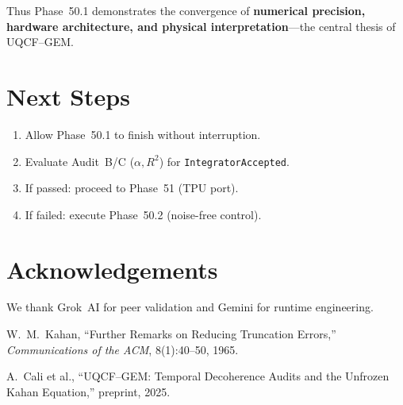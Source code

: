 \documentclass[11pt]{article}
\begin{document}
Thus Phase~50.1 demonstrates the convergence of \textbf{numerical precision, hardware architecture, and physical interpretation}---the central thesis of UQCF--GEM.

\section{Next Steps}
\begin{enumerate}[label=\arabic*.]
  \item Allow Phase~50.1 to finish without interruption.
  \item Evaluate Audit~B/C (\(\alpha, R^2\)) for \texttt{IntegratorAccepted}.
  \item If passed: proceed to Phase~51 (TPU port).
  \item If failed: execute Phase~50.2 (noise-free control).
\end{enumerate}

\section*{Acknowledgements}
We thank Grok~AI for peer validation and Gemini for runtime engineering.

\begin{thebibliography}{9}
W.~M.~Kahan, ``Further Remarks on Reducing Truncation Errors,'' \emph{Communications of the ACM}, 8(1):40–50, 1965.

A.~Cali et al., ``UQCF--GEM: Temporal Decoherence Audits and the Unfrozen Kahan Equation,'' preprint, 2025.
\end{thebibliography}
\end{document}
